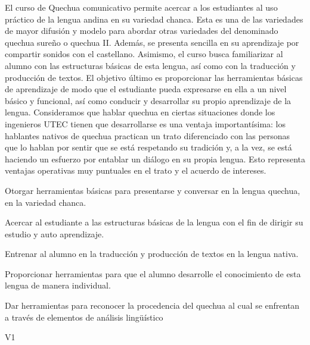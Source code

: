 \begin{syllabus}


\begin{justification}
El curso de Quechua comunicativo permite acercar a los estudiantes al uso práctico de la lengua andina en su variedad chanca. Esta es una de las variedades de mayor difusión y modelo para abordar otras variedades del denominado quechua sureño o quechua II. Además, se presenta sencilla en su aprendizaje por compartir sonidos con el castellano. Asimismo, el curso busca familiarizar al alumno con las estructuras básicas de esta lengua, así como con la traducción y producción de textos. El objetivo último es proporcionar las herramientas básicas de aprendizaje de modo que el estudiante pueda expresarse en ella a un nivel básico y funcional, así como conducir y desarrollar su propio aprendizaje de la lengua.
Consideramos que hablar quechua en ciertas situaciones donde los ingenieros UTEC tienen que desarrollarse es una ventaja importantísima: los hablantes nativos de quechua practican un trato diferenciado con las personas que lo hablan por sentir que se está respetando su tradición y, a la vez, se está haciendo un esfuerzo por entablar un diálogo en su propia lengua. Esto representa ventajas operativas muy puntuales en el trato y el acuerdo de intereses. 
\end{justification}

\begin{goals}
\item Otorgar herramientas básicas para presentarse y conversar en la lengua quechua, en la variedad chanca.
\item Acercar al estudiante a las estructuras básicas de la lengua con el fin de dirigir su estudio y auto aprendizaje.
\item Entrenar al alumno en la traducción y producción de textos en la lengua nativa.
\item Proporcionar herramientas para que el alumno desarrolle el conocimiento de esta lengua de manera individual.
\item Dar herramientas para reconocer la procedencia del quechua al cual se enfrentan a través de elementos de análisis lingüístico
\end{goals}

\begin{outcomes}{V1}
    \item {} %
    \item {} %
    \item {} %
    \item {} %
    \item {} %
\end{outcomes}


\end{syllabus}
